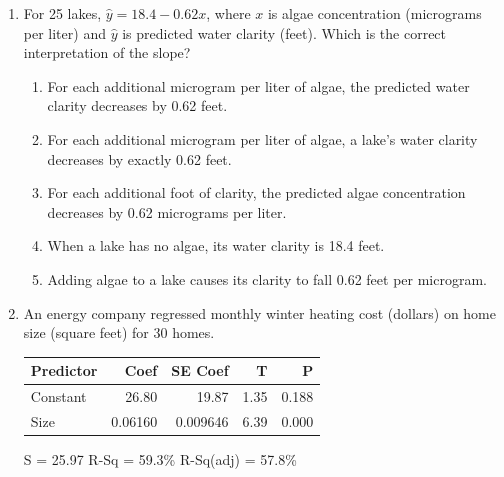 \documentclass[12pt]{article}
\begin{document}
\begin{enumerate}[leftmargin=1.9em, itemsep=0.13in]
  \boxguard[11]%
  \item For 25 lakes, $\hat{y} = 18.4 - 0.62x$, where $x$ is algae concentration (micrograms
        per liter) and $\hat{y}$ is predicted water clarity (feet). Which is the correct
        interpretation of the slope?
        \begin{enumerate}[label=\textbf{(\Alph*)}, leftmargin=2.2em, itemsep=2pt]
          \item For each additional microgram per liter of algae, the predicted water clarity
                decreases by 0.62 feet.
          \item For each additional microgram per liter of algae, a lake's water clarity
                decreases by exactly 0.62 feet.
          \item For each additional foot of clarity, the predicted algae concentration
                decreases by 0.62 micrograms per liter.
          \item When a lake has no algae, its water clarity is 18.4 feet.
          \item Adding algae to a lake causes its clarity to fall 0.62 feet per microgram.\hfill{}\rule[-0.2in]{0pt}{0.48in}
        \end{enumerate}

  \boxguard[15]%
  \item An energy company regressed monthly winter heating cost (dollars) on home size
        (square feet) for 30 homes.

        \vspace{2pt}
        {\centering\footnotesize\ttfamily
        \begin{tabular}{@{} l r r r r @{}}
        Predictor & Coef & SE Coef & T & P \\ \hline
        Constant & 26.80 & 19.87 & 1.35 & 0.188 \\
        Size & 0.06160 & 0.009646 & 6.39 & 0.000 \\
        \end{tabular}\par
        S = 25.97 \quad R-Sq = 59.3\% \quad R-Sq(adj) = 57.8\%\par}
        \vspace{2pt}


\end{enumerate}
\end{document}
